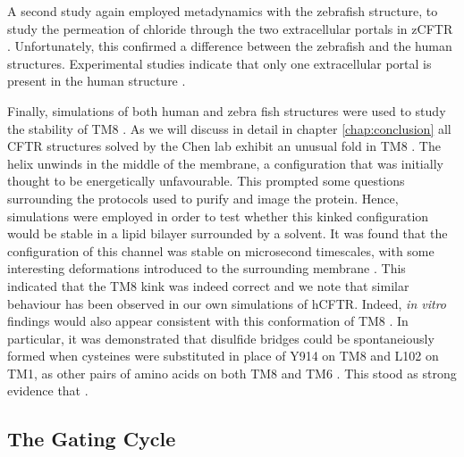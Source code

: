 A second study again employed metadynamics with the zebrafish structure, to study the permeation of chloride through the two extracellular portals in zCFTR \cite{farkas2020}. Unfortunately, this confirmed a difference between the zebrafish and the human structures. Experimental studies indicate that only one extracellular portal is present in the human structure \cite{linsdell2018}.

Finally, simulations of both human and zebra fish structures were used to study the stability of TM8 \cite{corradi2018}. As we will discuss in detail in chapter \ref{chap:conclusion} all CFTR structures solved by the Chen lab exhibit an unusual fold in TM8 \cite{fiedorczuk2021, liu2017, liu2019, zhang2016, zhang2018a, zhang2017a}. The helix unwinds in the middle of the membrane, a configuration that was initially thought to be energetically unfavourable. This prompted some questions surrounding the protocols used to purify and image the protein. Hence, simulations were employed in order to test whether this kinked configuration would be stable in a lipid bilayer surrounded by a solvent. It was found that the configuration of this channel was stable on microsecond timescales, with some interesting deformations introduced to the surrounding membrane \cite{corradi2018}. This indicated that the TM8 kink was indeed correct and we note that similar behaviour has been observed in our own simulations of hCFTR. Indeed, \textit{in vitro} findings would also appear consistent with this conformation of TM8 \cite{infield2021}. In particular, it was demonstrated that disulfide bridges could be  spontaneiously formed when cysteines were substituted in place of Y914 on TM8 and L102 on TM1, as other pairs of amino acids on both TM8 and TM6 \cite{negoda2019}. This stood as strong evidence that .



\subsection{The Gating Cycle}

